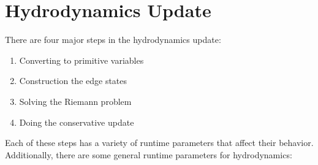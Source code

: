 \section{Hydrodynamics Update}

\label{Sec:Advection Step}

There are four major steps in the hydrodynamics update:
\begin{enumerate}
\item Converting to primitive variables
\item Construction the edge states
\item Solving the Riemann problem
\item Doing the conservative update
\end{enumerate}
Each of these steps has a variety of runtime parameters that
affect their behavior.  Additionally, there are some general
runtime parameters for hydrodynamics:
